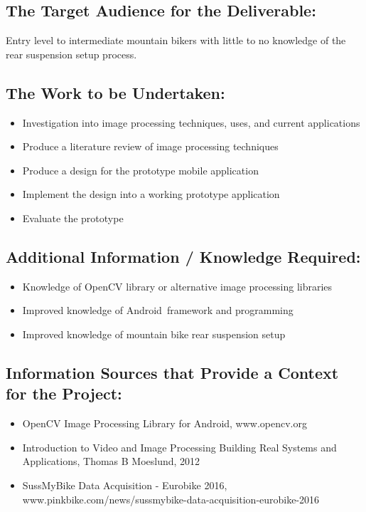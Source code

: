 \documentclass[a4paper, 12pt]{article}
\begin{document}
	\subsection[Audience]{The Target Audience for the Deliverable:}
	Entry level to intermediate mountain bikers with little to no knowledge of the rear suspension setup process.
	
	\subsection[Work]{The Work to be Undertaken:}
	\begin{itemize}
		\item Investigation into image processing techniques, uses, and current applications
		\item Produce a literature review of image processing techniques
		\item Produce a design for the prototype mobile application
		\item Implement the design into a working prototype application
		\item Evaluate the prototype
	\end{itemize}
	
	\subsection[Additional Info]{Additional Information / Knowledge Required:}
	\begin{itemize}
		\item Knowledge of OpenCV library or alternative image processing libraries
		\item Improved knowledge of Android\texttrademark\ framework and programming
		\item Improved knowledge of mountain bike rear suspension setup
	\end{itemize}
	
	\subsection[Sources]{Information Sources that Provide a Context for the Project:}
	\begin{itemize}
		\item OpenCV Image Processing Library for Android\texttrademark, www.opencv.org
		\item Introduction to Video and Image Processing Building Real Systems and Applications, Thomas B Moeslund, 2012
		\item SussMyBike Data Acquisition - Eurobike 2016,\newline
		www.pinkbike.com/news/sussmybike-data-acquisition-eurobike-2016
	\end{itemize}
	
\end{document}
